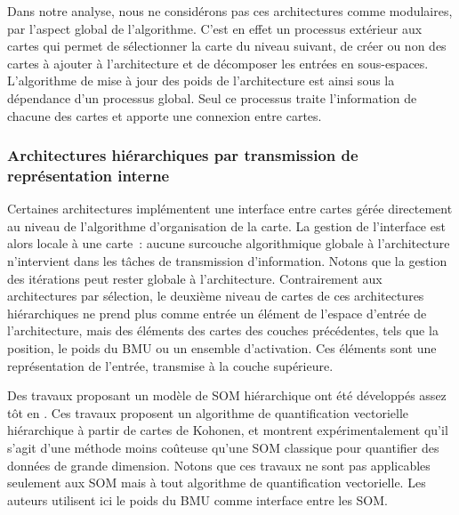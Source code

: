 \documentclass[../main]{subfiles}
\begin{document}
Dans notre analyse, nous ne considérons pas ces architectures comme modulaires, par l'aspect global de l'algorithme.
C'est en effet un processus extérieur aux cartes qui permet de sélectionner la carte du niveau suivant, de créer ou non des cartes à ajouter à l'architecture et de décomposer les entrées en sous-espaces. L'algorithme de mise à jour des poids de l'architecture est ainsi sous la dépendance d'un processus global.
Seul ce processus traite l'information de chacune des cartes et apporte une connexion entre cartes.

\subsubsection{Architectures hiérarchiques par transmission de représentation interne}

Certaines architectures implémentent une interface entre cartes gérée directement au niveau de l'algorithme d'organisation de la carte. La gestion de l'interface est alors locale à une carte~: aucune surcouche algorithmique globale à l'architecture n'intervient dans les tâches de transmission d'information. Notons que la gestion des itérations peut rester globale à l'architecture.
Contrairement aux architectures par sélection, le deuxième niveau de cartes de ces architectures hiérarchiques ne prend plus comme entrée un élément de l'espace d'entrée de l'architecture, mais des éléments des cartes des couches précédentes, tels que la position, le poids du BMU ou un ensemble d'activation.
Ces éléments sont une représentation de l'entrée, transmise à la couche supérieure.

Des travaux proposant un modèle de SOM hiérarchique ont été développés assez tôt en \cite{luttrell_hierarchical_1989}. 
Ces travaux proposent un algorithme de quantification vectorielle hiérarchique à partir de cartes de Kohonen, et montrent expérimentalement qu'il s'agit d'une méthode moins coûteuse qu'une SOM classique pour quantifier des données de grande dimension. Notons que ces travaux ne sont pas applicables seulement aux SOM mais à tout algorithme de quantification vectorielle. Les auteurs utilisent ici le poids du BMU comme interface entre les SOM.
\end{document}
